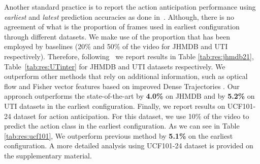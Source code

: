 Another standard practice is to report the action anticipation performance using {\em earliest} and {\em latest} prediction accuracies as done in~\cite{ryoo2011human,aliakbarian2017encouraging}. Although, there is no agreement of what is the proportion of frames used in earliest configuration through different datasets. We make use of the proportion that has been employed by baselines (20\% and 50\% of the video for JHMDB and UTI respectively). Therefore, following~\cite{aliakbarian2017encouraging} we report results in Table \ref{tab:res:jhmdb21}, Table~\ref{tab:res:UTinter} for JHMDB and UTI datasets respectively.
We outperform other methods that rely on additional information, such as optical flow \cite{ma2016learning,soomro2016online,soomro2016predicting} and Fisher vector features based on improved Dense Trajectories \cite{soomro2016online}. Our approach outperforms the state-of-the-art by \textbf{4.0\%} on JHMDB and by \textbf{5.2\%} on UTI datasets in the  earliest configuration. Finally, we report results on UCF101-24 dataset for action anticipation. For this dataset, we use 10\% of the video to predict the action class in the earliest configuration. As we can see in Table \ref{tab:res:ucf101}, We outperform previous method \cite{Singh2017} by \textbf{5.1\%} on the earliest configuration. A more detailed analysis using UCF101-24 dataset is provided on the supplementary material.

